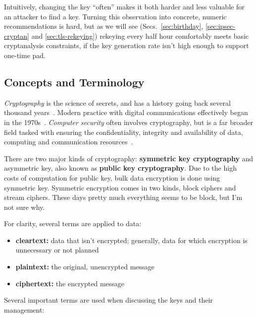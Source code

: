 Intuitively, changing the key ``often'' makes it both harder and less
valuable for an attacker to find a key.  Turning this observation into
concrete, numeric recommendations is hard, but as we will see
(Secs.~\ref{sec:birthday}, \ref{sec:ipsec-cryptan} and
\ref{sec:tls-rekeying}) rekeying every half hour comfortably meets
basic cryptanalysis constraints, if the key generation rate isn't high
enough to support one-time pad.

\subsection{Concepts and Terminology}

\emph{Cryptography} is the science of secrets, and has a history going
back several thousand years~\cite{kahn1996codebreakers,singh1999code}.
Modern practice with digital communications effectively began in the
1970s~\cite{schneier96:_applied_crypto,menezes1996handbook}.
\emph{Computer security} often involves cryptography, but is a far
broader field tasked with ensuring the confidentiality, integrity and
availability of data, computing and communication
resources~\cite{bishop2002art}.

There are two major kinds of cryptography: {\bf symmetric key
  cryptography} and asymmetric key, also known as {\bf public key
  cryptography}.  Due to the high costs of computation for public key,
bulk data encryption is done using symmetric key.  Symmetric
encryption comes in two kinds, block ciphers and stream ciphers.
These days pretty much everything seems to be block, but I'm not sure
why.  \aonolook{}

For clarity, several terms are applied to data:

\begin{itemize}
\item {\bf cleartext:} data that isn't encrypted; generally, data for
  which encryption is unnecessary or not planned
\item {\bf plaintext:} the original, unencrypted message
\item {\bf ciphertext:} the encrypted message
\end{itemize}

Several important terms are used when discussing the keys and their
management:


